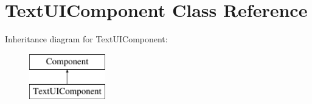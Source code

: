 \hypertarget{class_text_u_i_component}{\section{Text\+U\+I\+Component Class Reference}
\label{class_text_u_i_component}
}
Inheritance diagram for Text\+U\+I\+Component\+:\begin{figure}[H]
\begin{center}
\leavevmode
\includegraphics[height=2.000000cm]{class_text_u_i_component}
\end{center}
\end{figure}

